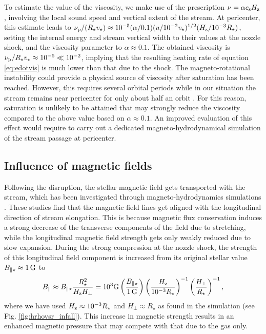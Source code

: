 \documentclass[a4paper,fleqn,usenatbib]{mnras}
\newcommand{\be}{\begin{equation}}
\newcommand{\ee}{\end{equation}}
\newcommand{\rstar}{R_{\star}}
\def\gauss{\, \rm G}
\begin{document}
To estimate the value of the viscosity, we make use of the prescription $\nu = \alpha c_{\rm s} H_{\rm z}$, involving the local sound speed and vertical extent of the stream. At pericenter, this estimate leads to $\nu_{\rm p}/(\rstar v_{\star}) \approx 10^{-5} (\alpha/0.1) (u / 10^{-2} v_{\star})^{1/2} (H_{\rm z}/10^{-3} \rstar)$, setting the internal energy and stream vertical width to their values at the nozzle shock, and the viscosity parameter to $\alpha \approx 0.1$. The obtained viscosity is $\nu_{\rm p}/  \rstar v_{\star} \approx 10^{-5} \ll 10^{-2}$, implying that the resulting heating rate of equation \eqref{eq:edotvis} is much lower than that due to the shock. The magneto-rotational instability \citetext{MRI, \citealt{balbus1991}} could provide a physical source of viscosity after saturation has been reached. However, this requires several orbital periods while in our situation the stream remains near pericenter for only about half an orbit \citep{guillochon2014-10jh,chan2018}. For this reason, saturation is unlikely to be attained that may strongly reduce the viscosity compared to the above value based on $\alpha \approx 0.1$. An improved evaluation of this effect would require to carry out a dedicated magneto-hydrodynamical simulation of the stream passage at pericenter.




\subsection{Influence of magnetic fields}

\label{sec:magnetic}


Following the disruption, the stellar magnetic field gets transported with the stream, which has been investigated through magneto-hydrodynamics simulations \citep{guillochon2017-magnetic,bonnerot2017-magnetic}. These studies find that the magnetic field lines get aligned with the longitudinal direction of stream elongation. This is  because magnetic flux conservation induces a strong decrease of the transverse components of the field due to stretching, while the longitudinal magnetic field strength gets only weakly reduced due to slow expansion. During the strong compression at the nozzle shock, the strength of this longitudinal field component is increased from its original stellar value $B_{\parallel \star} \approx 1 \gauss$ to 
\be
B_{\parallel} \approx B_{\parallel \star} \frac{\rstar^2}{H_{\rm z} H_{\perp} } = 10^3 {\rm G} \left( \frac{B_{\parallel \star}}{1 \gauss} \right) \left( \frac{H_{\rm z}}{10^{-3} \rstar} \right)^{-1} \left( \frac{H_{\perp}}{\rstar} \right)^{-1},
\label{eq:magnetic}
\ee
where we have used $H_{\rm z} \approx 10^{-3} \rstar$ and $H_{\perp} \approx \rstar$ as found in the simulation (see Fig. \ref{fig:hrhovsr_infall}). This increase in magnetic strength results in an enhanced magnetic pressure that may compete with that due to the gas only.
\end{document}
